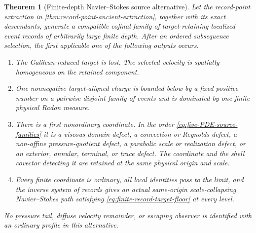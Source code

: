 \documentclass[11pt]{amsart}
\numberwithin{equation}{section}
\theoremstyle{plain}
\newtheorem{theorem}{Theorem}[section]
\theoremstyle{definition}
\theoremstyle{remark}
\begin{document}
\begin{theorem}[Finite-depth Navier--Stokes source alternative]
\label{thm:finite-depth-NS-source-alternative}
Let the record-point extraction in
\cref{thm:record-point-ancient-extraction}, together with its exact
descendants, generate a compatible cofinal family of target-retaining
localized event records of arbitrarily large finite depth.  After an ordered
subsequence selection, the first applicable one of the following outputs
occurs.
\begin{enumerate}[label=\textup{(F\arabic*)},leftmargin=2.8em]
\item The Galilean-reduced target is lost.  The selected velocity is spatially
homogeneous on the retained component.
\item One nonnegative target-aligned charge is bounded below by a fixed
positive number on a pairwise disjoint family of events and is dominated by
one finite physical Radon measure.
\item There is a first nonordinary coordinate.  In the order
\eqref{eq:five-PDE-source-families} it is a viscous-domain defect, a
convection or Reynolds defect, a non-affine pressure-quotient defect, a
parabolic scale or realization defect, or an exterior, annular, terminal, or
trace defect.  The coordinate and the shell covector detecting it are
retained at the same physical origin and scale.
\item Every finite coordinate is ordinary, all local identities pass to the
limit, and the inverse system of records gives an actual same-origin
scale-collapsing Navier--Stokes path satisfying
\eqref{eq:finite-record-target-floor} at every level.
\end{enumerate}
No pressure tail, diffuse velocity remainder, or escaping observer is
identified with an ordinary profile in this alternative.
\end{theorem}
\end{document}
